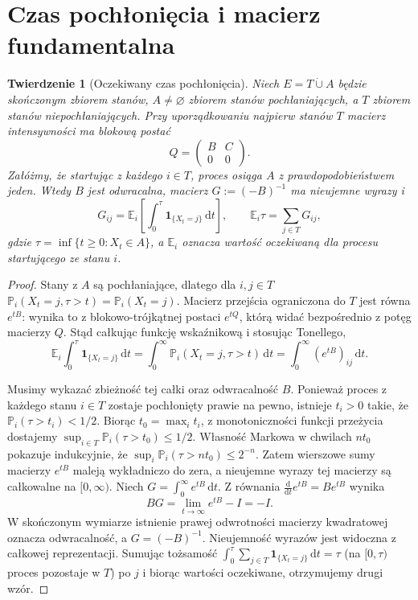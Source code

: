 \documentclass[11pt,a4paper,oneside]{report}
\numberwithin{equation}{chapter}
\theoremstyle{plain}
\newtheorem{twierdzenie}{Twierdzenie}[chapter]
\theoremstyle{definition}
\theoremstyle{remark}
\newcommand{\Prob}{\mathbb{P}}
\newcommand{\E}{\mathbb{E}}
\newcommand{\ind}[1]{\mathbf{1}_{#1}}
\newcommand{\dd}{\mathrm{d}}
\begin{document}
\section{Czas pochłonięcia i macierz fundamentalna}
\begin{twierdzenie}[Oczekiwany czas pochłonięcia]
\label{thm:ctmc-absorption}
Niech $E=T\mathbin{\dot\cup}A$ będzie skończonym zbiorem stanów,
$A\ne\varnothing$ zbiorem stanów pochłaniających,
a $T$ zbiorem stanów niepochłaniających. Przy uporządkowaniu
najpierw stanów $T$ macierz intensywności ma blokową postać
\[
Q=\begin{pmatrix}B&C\\0&0\end{pmatrix}.
\]
Załóżmy, że startując z każdego $i\in T$, proces
osiąga $A$ z prawdopodobieństwem jeden.
Wtedy $B$ jest odwracalna, macierz
$G:=(-B)^{-1}$ ma nieujemne wyrazy i
\[
G_{ij}=\E_i\left[\int_0^\tau\ind{\{X_t=j\}}\,\dd t\right],
\qquad
\E_i\tau=\sum_{j\in T}G_{ij},
\]
gdzie $\tau=\inf\{t\ge0:X_t\in A\}$, a
$\E_i$ oznacza wartość oczekiwaną dla procesu
startującego ze stanu $i$.
\end{twierdzenie}
\begin{proof}
Stany z $A$ są pochłaniające, dlatego dla $i,j\in T$
$\Prob_i(X_t=j,\tau>t)=\Prob_i(X_t=j)$.
Macierz przejścia ograniczona do $T$ jest równa $e^{tB}$:
wynika to z blokowo-trójkątnej postaci $e^{tQ}$,
którą widać bezpośrednio z potęg macierzy $Q$.
Stąd całkując funkcję wskaźnikową i stosując Tonellego,
\[
\E_i\int_0^\tau\ind{\{X_t=j\}}\,\dd t
=\int_0^\infty\Prob_i(X_t=j,\tau>t)\,\dd t
=\int_0^\infty(e^{tB})_{ij}\,\dd t.
\]

Musimy wykazać zbieżność tej całki oraz odwracalność $B$.
Ponieważ proces z każdego stanu $i\in T$ zostaje pochłonięty
prawie na pewno, istnieje $t_i>0$ takie, że
$\Prob_i(\tau>t_i)<1/2$. Biorąc $t_0=\max_i t_i$,
z monotoniczności funkcji przeżycia dostajemy
$\sup_{i\in T}\Prob_i(\tau>t_0)\le1/2$.
Własność Markowa w chwilach $nt_0$ pokazuje indukcyjnie,
że $\sup_i\Prob_i(\tau>nt_0)\le2^{-n}$.
Zatem wierszowe sumy macierzy $e^{tB}$ maleją
wykładniczo do zera, a nieujemne wyrazy tej macierzy
są całkowalne na $[0,\infty)$. Niech
$G=\int_0^\infty e^{tB}\,\dd t$.
Z równania $\frac{\dd}{\dd t}e^{tB}=Be^{tB}$ wynika
\[
BG=\lim_{t\to\infty}e^{tB}-I=-I.
\]
W skończonym wymiarze istnienie prawej odwrotności
macierzy kwadratowej oznacza odwracalność, a
$G=(-B)^{-1}$. Nieujemność wyrazów jest widoczna
z całkowej reprezentacji. Sumując tożsamość
$\int_0^\tau\sum_{j\in T}\ind{\{X_t=j\}}\,\dd t=\tau$
(na $[0,\tau)$ proces pozostaje w $T$)
po $j$ i biorąc wartości oczekiwane,
otrzymujemy drugi wzór.
\end{proof}
\end{document}
